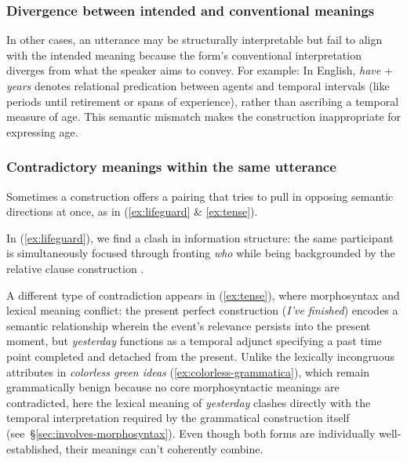 \documentclass[12pt,letterpaper]{article}
\begin{document}
\subsubsection{Divergence between intended and conventional meanings}

In other cases, an utterance may be structurally interpretable but fail to align with the intended meaning because the form’s conventional interpretation diverges from what the speaker aims to convey. For example:
\label{ex:have-years}
\z
In English, \textit{have }+\textit{ years} denotes relational predication between agents and temporal intervals (like periods until retirement or spans of experience), rather than ascribing a temporal measure of age. This semantic mismatch makes the construction inappropriate for expressing age.

\subsubsection{Contradictory meanings within the same utterance}

Sometimes a construction offers a pairing that tries to pull in opposing semantic directions at once, as in (\ref{ex:lifeguard} \& \ref{ex:tense}).

\z
{}
\z

In (\ref{ex:lifeguard}), we find a clash in information structure: the same participant is simultaneously focused through fronting \textit{who} while being backgrounded by the relative clause construction \autocite{CuneoGoldberg2023}.

A different type of contradiction appears in (\ref{ex:tense}), where morphosyntax and lexical meaning conflict: the present perfect construction (\textit{I've finished}) encodes a semantic relationship wherein the event's relevance persists into the present moment, but \textit{yesterday} functions as a temporal adjunct specifying a past time point completed and detached from the present. Unlike the lexically incongruous attributes in \textit{colorless green ideas} (\ref{ex:colorless-grammatica}), which remain grammatically benign because no core morphosyntactic meanings are contradicted, here the lexical meaning of \textit{yesterday} clashes directly with the temporal interpretation required by the grammatical construction itself (see~\S\ref{sec:involves-morphosyntax}). Even though both forms are individually well-established, their meanings can't coherently combine.
\end{document}
